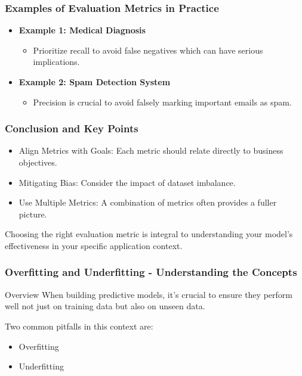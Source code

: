\documentclass[aspectratio=169]{beamer}
\begin{document}
\begin{frame}[fragile]
    \frametitle{Examples of Evaluation Metrics in Practice}
    \begin{itemize}
        \item \textbf{Example 1: Medical Diagnosis}
        \begin{itemize}
            \item Prioritize recall to avoid false negatives which can have serious implications.
        \end{itemize}
        
        \item \textbf{Example 2: Spam Detection System}
        \begin{itemize}
            \item Precision is crucial to avoid falsely marking important emails as spam.
        \end{itemize}
    \end{itemize}
\end{frame}

\begin{frame}[fragile]
    \frametitle{Conclusion and Key Points}
    \begin{itemize}
        \item Align Metrics with Goals: Each metric should relate directly to business objectives.
        \item Mitigating Bias: Consider the impact of dataset imbalance.
        \item Use Multiple Metrics: A combination of metrics often provides a fuller picture.
    \end{itemize}
    Choosing the right evaluation metric is integral to understanding your model's effectiveness in your specific application context.
\end{frame}

\begin{frame}[fragile]
    \frametitle{Overfitting and Underfitting - Understanding the Concepts}
    \begin{block}{Overview}
        When building predictive models, it’s crucial to ensure they perform well not just on training data but also on unseen data. 
    \end{block}
    
    Two common pitfalls in this context are:
    \begin{itemize}
        \item Overfitting
        \item Underfitting
    \end{itemize}
\end{frame}
\end{document}
